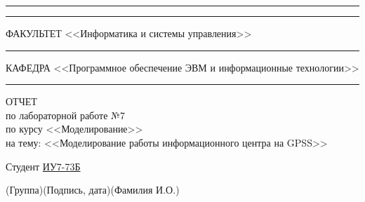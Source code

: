\begin{titlepage}
	\vspace{-2pt}
	\hspace{-34.5pt}\rule{\textwidth}{2.5pt}
	
	\vspace*{-20.3pt}
	\hspace{-34.5pt}\rule{\textwidth}{0.4pt}
	
	\vspace{0.5ex}
	\noindent \small ФАКУЛЬТЕТ\hspace{80pt} <<Информатика и системы управления>>
	
	\vspace*{-16pt}
	\hspace{35pt}\rule{0.855\textwidth}{0.4pt}
	
	\vspace{0.5ex}
	\noindent \small КАФЕДРА\hspace{50pt} <<Программное обеспечение ЭВМ и информационные технологии>>
	
	\vspace*{-16pt}
	\hspace{25pt}\rule{0.875\textwidth}{0.4pt}
	
	
	\vspace{3em}
	
	\begin{center}
		\Large {ОТЧЕТ}\\
		\normalsize по лабораторной работе №7\\
		по курсу <<Моделирование>>\\
		на тему: <<Моделирование работы информационного центра на GPSS>>
	\end{center}
	
	\vspace{\fill}
	
	
	\newlength{\ML}
	
	\noindent Студент \underline{\hspace{0.1cm}ИУ7-73Б\hspace{0.1cm}} \hfill \underline{\hspace{4cm}}\quad
	\underline{\hspace{0.4cm}\hspace{0.5cm}}
	
	\vspace{-2.1ex}
	\noindent\hspace{9ex}\scriptsize{(Группа)}\normalsize\hspace{170pt}\hspace{2ex}\scriptsize{(Подпись, дата)}\normalsize\hspace{30pt}\hspace{6ex}\scriptsize{(Фамилия И.О.)}\normalsize
	

\end{titlepage}
